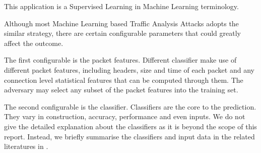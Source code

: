 This application is a Supervised Learning in Machine Learning terminology.

Although most Machine Learning based Traffic Analysis Attacks adopts the similar strategy, there are certain configurable parameters that could greatly affect the outcome.

The first configurable is the packet features. Different classifier make use of different packet features, including headers, size and time of each packet and any connection level statistical features that can be computed through them. The adversary may select any subset of the packet features into the training set.

The second configurable is the classifier. Classifiers are the core to the prediction. They vary in construction,  accuracy, performance and even inputs. We do not give the detailed explanation about the classifiers as it is beyond the scope of this report. Instead, we briefly summarise the classifiers and input data in the related literatures in .

